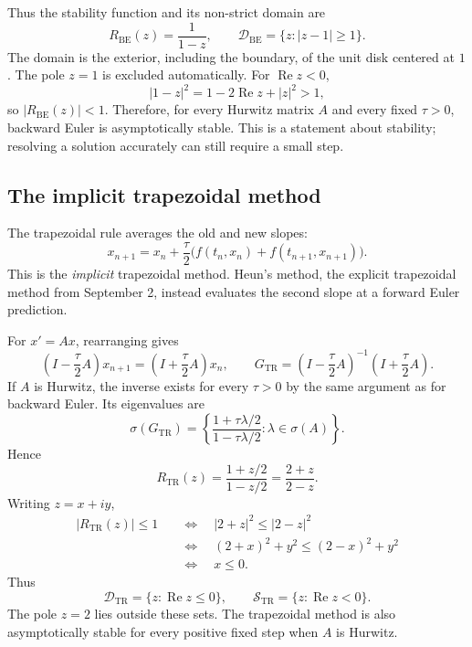 Thus the stability function and its non-strict domain are
\begin{equation}\label{eq:be-domain-sep-18}
 R_{\mathrm{BE}}(z)=\frac1{1-z},
 \qquad
 \mathcal D_{\mathrm{BE}}=\{z:|z-1|\geq1\}.
\end{equation}
The domain is the exterior, including the boundary, of the unit disk
centered at \(1\). The pole \(z=1\) is excluded automatically.
For \(\operatorname{Re}z<0\),
\[
 |1-z|^2=1-2\operatorname{Re}z+|z|^2>1,
\]
so \(|R_{\mathrm{BE}}(z)|<1\). Therefore, for every Hurwitz matrix
\(A\) and every fixed \(\tau>0\), backward Euler is asymptotically
stable. This is a statement about stability; resolving a solution
accurately can still require a small step.

\subsection{The implicit trapezoidal method}

The trapezoidal rule averages the old and new slopes:
\begin{equation}\label{eq:trapezoidal-sep-18}
 x_{n+1}=x_n+\frac{\tau}{2}
   \bigl(f(t_n,x_n)+f(t_{n+1},x_{n+1})\bigr).
\end{equation}
This is the \emph{implicit} trapezoidal method. Heun's method, the
explicit trapezoidal method from September 2, instead evaluates
the second slope at a forward Euler prediction.

For \(x'=Ax\), rearranging gives
\[
 \left(I-\frac\tau2 A\right)x_{n+1}
   =\left(I+\frac\tau2 A\right)x_n,
 \qquad
 G_{\mathrm{TR}}=
 \left(I-\frac\tau2 A\right)^{-1}\left(I+\frac\tau2 A\right).
\]
If \(A\) is Hurwitz, the inverse exists for every \(\tau>0\) by the
same argument as for backward Euler. Its eigenvalues are
\[
 \sigma(G_{\mathrm{TR}})
  =\left\{\frac{1+\tau\lambda/2}{1-\tau\lambda/2}:
       \lambda\in\sigma(A)\right\}.
\]
Hence
\begin{equation}\label{eq:trapezoidal-stability-function-sep-18}
 R_{\mathrm{TR}}(z)=\frac{1+z/2}{1-z/2}=\frac{2+z}{2-z}.
\end{equation}
Writing \(z=x+iy\),
\begin{align*}
 |R_{\mathrm{TR}}(z)|\leq1
 &\quad\Longleftrightarrow\quad |2+z|^2\leq|2-z|^2\\
 &\quad\Longleftrightarrow\quad (2+x)^2+y^2\leq(2-x)^2+y^2\\
 &\quad\Longleftrightarrow\quad x\leq0.
\end{align*}
Thus
\begin{equation}\label{eq:trapezoidal-domain-sep-18}
 \mathcal D_{\mathrm{TR}}=\{z:\operatorname{Re}z\leq0\},
 \qquad
 \mathcal S_{\mathrm{TR}}=\{z:\operatorname{Re}z<0\}.
\end{equation}
The pole \(z=2\) lies outside these sets. The trapezoidal method is
also asymptotically stable for every positive fixed step when \(A\)
is Hurwitz.


